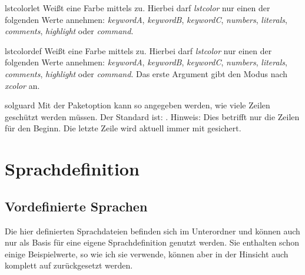 \documentclass{sopra-base}
\begin{document}
\begin{command}{lstcolorlet}{}
    Weißt eine Farbe mittels  zu. Hierbei darf \emph{lstcolor} nur einen der folgenden Werte annehmen: \emph{keywordA}, \emph{keywordB}, \emph{keywordC}, \emph{numbers}, \emph{literals}, \emph{comments}, \emph{highlight} oder \emph{command}. 
\end{command}

\begin{command}{lstcolordef}{}
    Weißt eine Farbe mittels  zu. Hierbei darf \emph{lstcolor} nur einen der folgenden Werte annehmen: \emph{keywordA}, \emph{keywordB}, \emph{keywordC}, \emph{numbers}, \emph{literals}, \emph{comments}, \emph{highlight} oder \emph{command}. Das erste Argument gibt den Modus nach \emph{xcolor} an.
\end{command}

\begin{command}{solguard}{}
    Mit der Paketoption  kann so angegeben werden, wie viele Zeilen geschützt werden müssen.
    Der Standard ist: \glqq{}{\makeatletter\@sol@guard@default}\grqq. Hinweis: Dies betrifft nur die Zeilen für den Beginn. Die letzte Zeile wird aktuell immer mit  gesichert.
\end{command}

\clearpage
\appendix
\section{Sprachdefinition}

\subsection{Vordefinierte Sprachen}
\label{sec:vordefinierteSprachen}

Die hier definierten Sprachdateien befinden sich im Unterordner  und können auch nur als Basis für eine eigene Sprachdefinition genutzt werden. Sie enthalten schon einige Beispielwerte, so wie ich sie verwende, können aber in der Hinsicht auch komplett
auf  zurückgesetzt werden. 
\end{document}
